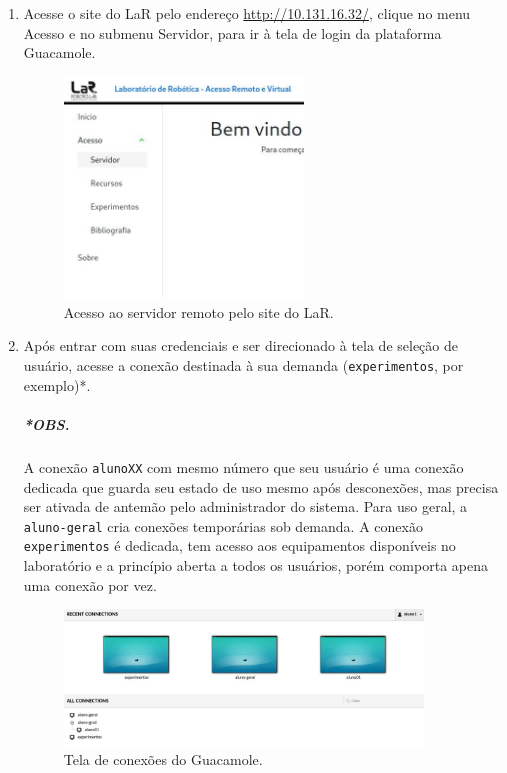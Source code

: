 \documentclass[12pt]{article}
\begin{document}
\begin{enumerate}[font=\bfseries]
    \item Acesse o site do LaR pelo endereço \url{http://10.131.16.32/}, clique no menu Acesso e no submenu Servidor, para ir à tela de login da plataforma Guacamole.
    
    \begin{figure}[H]
    \centering
    \includegraphics[width=0.6\textwidth]{img/site-lar.jpg}
    \caption{\label{ref:site-lar}Acesso ao servidor remoto pelo site do LaR.}
    \end{figure}
    
    \pagebreak
    
    \item Após entrar com suas credenciais e ser direcionado à tela de seleção de usuário, acesse a conexão destinada à sua demanda (\verb|experimentos|, por exemplo)*.
    
    \subparagraph{*OBS.} A conexão \verb|alunoXX| com mesmo número que seu usuário é uma conexão dedicada que guarda seu estado de uso mesmo após desconexões, mas precisa ser ativada de antemão pelo administrador do sistema.
    Para uso geral, a \verb|aluno-geral| cria conexões temporárias sob demanda.
    A conexão \verb|experimentos| é dedicada, tem acesso aos equipamentos disponíveis no laboratório e a princípio aberta a todos os usuários, porém comporta apena uma conexão por vez.
    
    \begin{figure}[H]
    \centering
    \includegraphics[width=0.9\textwidth]{img/conexao-guaca.jpg}
    \caption{\label{ref:conexao-guaca}Tela de conexões do Guacamole.}
    \end{figure}
    

\end{enumerate}
\end{document}
